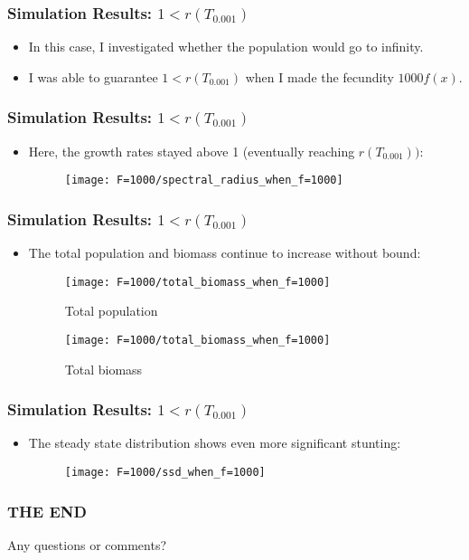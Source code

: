 \documentclass{beamer}
\begin{document}
\begin{frame}
	\frametitle{Simulation Results: $1 < r(T_{0.001})$}
	\begin{itemize}
		\pause 
		\item In this case, I investigated whether the population would go to infinity.
		\pause
		\item I was able to guarantee $1 < r(T_{0.001})$ when I made the fecundity $1000f(x)$.
	\end{itemize}
\end{frame}

\begin{frame}
	\frametitle{Simulation Results: $1 < r(T_{0.001})$}
	\begin{itemize}
		\pause
		\item Here, the growth rates stayed above 1 (eventually reaching $r(T_{0.001}))$:
		
\begin{figure}
	\centering
	\texttt{[image: F=1000/spectral\_radius\_when\_f=1000]}
\end{figure}
	\end{itemize}
\end{frame}

\begin{frame}
	\frametitle{Simulation Results: $1 < r(T_{0.001})$}
	\begin{itemize}
		\pause
		\item The total population and biomass continue to increase without bound:
		
\begin{figure}[H]
	\centering
	\begin{minipage}{.4\textwidth}
		\texttt{[image: F=1000/total\_biomass\_when\_f=1000]}
		\caption{Total population}
	\end{minipage} \quad 
	\centering
	\begin{minipage}{.4\textwidth}
		\texttt{[image: F=1000/total\_biomass\_when\_f=1000]}
		\caption{Total biomass}
	\end{minipage}
\end{figure}
	\end{itemize}
\end{frame}

\begin{frame}
	\frametitle{Simulation Results: $1 < r(T_{0.001})$}
	\begin{itemize}
		\pause
		\item The steady state distribution shows even more significant stunting:
		\pause
		
\begin{figure}
	\centering
	\texttt{[image: F=1000/ssd\_when\_f=1000]}
\end{figure}
		
	\end{itemize}
\end{frame}


\begin{frame}
	\frametitle{THE END}
	\begin{center}
Any questions or comments?
\end{center}
\end{frame}
\end{document}
